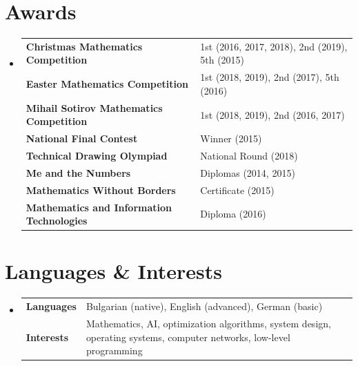 \documentclass[a4paper,11pt]{article}
\begin{document}
\section{Awards}
 \begin{itemize}[leftmargin=0.15in, label={}]
    \item\small
    \renewcommand{\arraystretch}{1.08}
    \begin{tabularx}{0.97\textwidth}{@{}l@{\hspace{1.5em}}>{\raggedright\arraybackslash}X@{}}
      \textbf{Christmas Mathematics Competition}        & 1st (2016, 2017, 2018), 2nd (2019), 5th (2015) \\
      \textbf{Easter Mathematics Competition}           & 1st (2018, 2019), 2nd (2017), 5th (2016) \\
      \textbf{Mihail Sotirov Mathematics Competition}   & 1st (2018, 2019), 2nd (2016, 2017) \\
      \textbf{National Final Contest}                   & Winner (2015) \\
      \textbf{Technical Drawing Olympiad}               & National Round (2018) \\
      \textbf{Me and the Numbers}                       & Diplomas (2014, 2015) \\
      \textbf{Mathematics Without Borders}              & Certificate (2015) \\
      \textbf{Mathematics and Information Technologies} & Diploma (2016) \\
    \end{tabularx}
 \end{itemize}


\section{Languages \& Interests}
 \begin{itemize}[leftmargin=0.15in, label={}]
    \item\small
    \renewcommand{\arraystretch}{1.08}
    \begin{tabularx}{0.97\textwidth}{@{}p{3.85cm}>{\raggedright\arraybackslash}X@{}}
      \textbf{Languages} & Bulgarian (native), English (advanced), German (basic) \\
      \textbf{Interests} & Mathematics, AI, optimization algorithms, system design, operating systems, computer networks, low-level programming \\
    \end{tabularx}
 \end{itemize}


\end{document}
